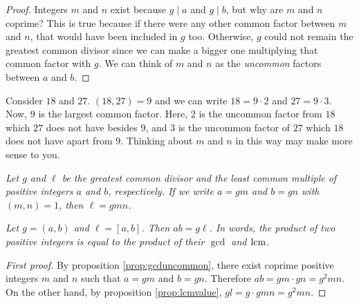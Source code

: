 \documentclass{subfile}
\begin{document}
	\begin{proof}
		Integers $m$ and $n$ exist because $g\mid a$ and $g\mid b$, but why are $m$ and $n$ coprime? This is true because if there were any other common factor between $m$ and $n$, that would have been included in $g$ too. Otherwise, $g$ could not remain the greatest common divisor since we can make a bigger one multiplying that common factor with $g$. We can think of $m$ and $n$ as the \textit{uncommon} factors between $a$ and $b$.
	\end{proof}

	\begin{example}
		Consider $18$ and $27$. $(18,27)=9$ and we can write $18=9\cdot2$ and $27=9\cdot3$. Now, $9$ is the largest common factor. Here, $2$ is the uncommon factor from $18$ which $27$ does not have besides $9$, and $3$ is the uncommon factor of $27$ which $18$ does not have apart from $9$. Thinking about $m$ and $n$ in this way may make more sense to you.
	\end{example}

	\begin{proposition}\slshape\label{prop:lcmvalue}
		Let $g$ and $\ell$ be the greatest common divisor and the least common multiple of positive integers $a$ and $b$, respectively. If we write $a=gm$ and $b=gn$ with $(m,n)=1$, then $\ell=gmn$.
	\end{proposition}

	\begin{proposition}\slshape
		Let $g=(a,b)$ and $\ell = [a,b]$. Then $ab=g\ell$. In words, the product of two positive integers is equal to the product of their $\gcd$ and $\operatorname{lcm}$.
	\end{proposition}


	\begin{proof}[First proof]
		By proposition \eqref{prop:gcduncommon}, there exist coprime positive integers $m$ and $n$ such that $a=gm$ and $b=gn$. Therefore $ab=gm\cdot gn=g^2mn$. On the other hand, by proposition \eqref{prop:lcmvalue}, $gl=g\cdot gmn=g^2mn$.
	\end{proof}
\end{document}
